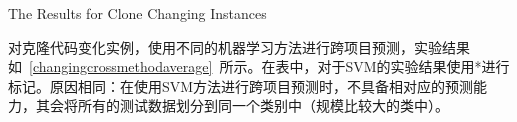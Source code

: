 
{The Results for Clone Changing Instances}

对克隆代码变化实例，使用不同的机器学习方法进行跨项目预测，实验结果如~\ref{changingcrossmethodaverage}~所示。在表中，对于SVM的实验结果使用{*}进行标记。原因相同：在使用SVM方法进行跨项目预测时，不具备相对应的预测能力，其会将所有的测试数据划分到同一个类别中（规模比较大的类中）。

